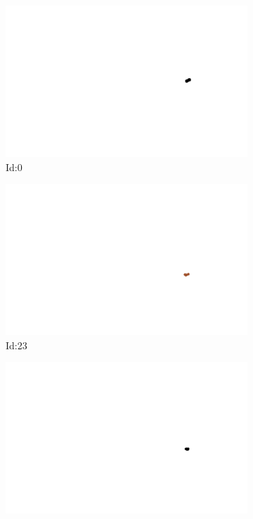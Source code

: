 \documentclass[12pt,twoside]{report}
\begin{document}
\begin{figure}
\centering
\begin{subfigure}[b]{0.20\textwidth}
\centering
\includegraphics[width=\textwidth]{../trajectories/0.png}
\caption{Id:0}
\end{subfigure}
\begin{subfigure}[b]{0.20\textwidth}
\centering
\includegraphics[width=\textwidth]{../trajectories/23.png}
\caption{Id:23}
\end{subfigure}
\begin{subfigure}[b]{0.20\textwidth}
\centering
\includegraphics[width=\textwidth]{../trajectories/56.png}

\end{subfigure}
\end{figure}
\end{document}
